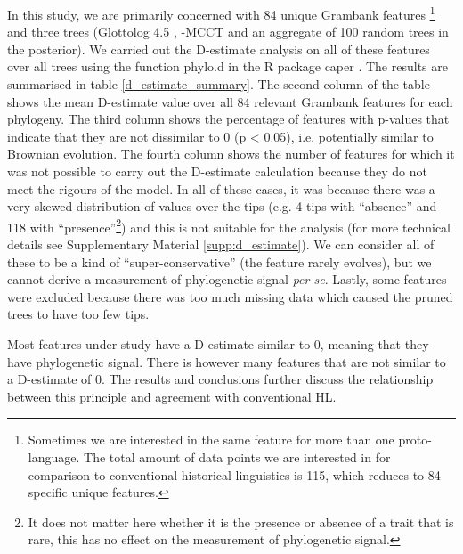 \documentclass[12pt,letterpaper]{article}
\begin{document}
In this study, we are primarily concerned with 84 unique Grambank features \footnote{Sometimes we are interested in the same feature for more than one proto-language. The total amount of data points we are interested in for comparison to conventional historical linguistics is 115, which reduces to 84 specific unique features.} and three trees (Glottolog 4.5 \citep{glottolog4_5}, \citet{grayetal_2009}-MCCT and an aggregate of 100 random trees in the \citet{grayetal_2009} posterior). We carried out the D-estimate analysis on all of these features over all trees using the function phylo.d in the R package caper \citep{orme2013caper}. The results are summarised in table \ref{d_estimate_summary}. The second column of the table shows the mean D-estimate value over all 84 relevant Grambank features for each phylogeny. The third column shows the percentage of features with p-values that indicate that they are not dissimilar to 0 (p < 0.05), i.e. potentially similar to Brownian evolution. The fourth column shows the number of features for which it was not possible to carry out the D-estimate calculation because they do not meet the rigours of the model. In all of these cases, it was because there was a very skewed distribution of values over the tips (e.g. 4 tips with ``absence'' and 118 with ``presence''\footnote{It does not matter here whether it is the presence or absence of a trait that is rare, this has no effect on the measurement of phylogenetic signal.}) and this is not suitable for the analysis (for more technical details see Supplementary Material \ref{supp:d_estimate}). We can consider all of these to be a kind of ``super-conservative'' (the feature rarely evolves), but we cannot derive a measurement of phylogenetic signal \emph{per se}. Lastly, some features were excluded because there was too much missing data which caused the pruned trees to have too few tips.



Most features under study have a D-estimate similar to 0, meaning that they have phylogenetic signal. There is however many features that are not similar to a D-estimate of 0. The results and conclusions further discuss the relationship between this principle and agreement with conventional HL.
\end{document}
